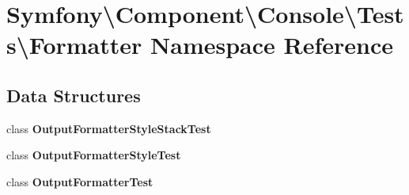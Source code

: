 \section{Symfony\textbackslash{}Component\textbackslash{}Console\textbackslash{}Tests\textbackslash{}Formatter Namespace Reference}
\label{namespace_symfony_1_1_component_1_1_console_1_1_tests_1_1_formatter}
\subsection*{Data Structures}
\begin{DoxyCompactItemize}
\item 
class {\bf Output\+Formatter\+Style\+Stack\+Test}
\item 
class {\bf Output\+Formatter\+Style\+Test}
\item 
class {\bf Output\+Formatter\+Test}
\end{DoxyCompactItemize}
